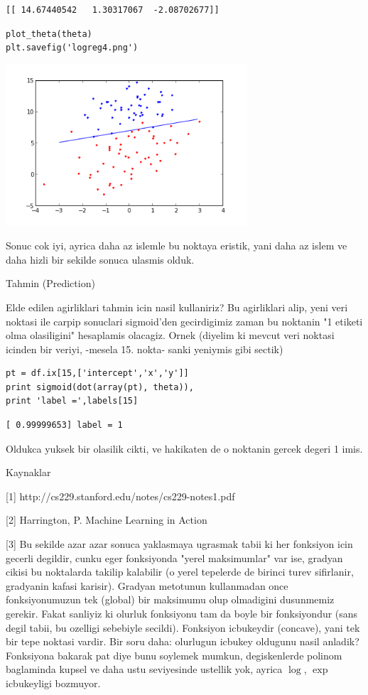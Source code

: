 \documentclass[12pt,fleqn]{article}\usepackage{../common}
\begin{document}
\begin{verbatim}
[[ 14.67440542   1.30317067  -2.08702677]]
\end{verbatim}

\begin{verbatim}
plot_theta(theta)
plt.savefig('logreg4.png')
\end{verbatim}

\includegraphics[height=6cm]{logreg4.png}

Sonuc cok iyi, ayrica daha az islemle bu noktaya eristik, yani daha
az islem ve daha hizli bir sekilde sonuca ulasmis olduk.

Tahmin (Prediction)

Elde edilen agirliklari tahmin icin nasil kullaniriz? Bu agirliklari
alip, yeni veri noktasi ile carpip sonuclari sigmoid'den gecirdigimiz
zaman bu noktanin "1 etiketi olma olasiligini" hesaplamis
olacagiz. Ornek (diyelim ki mevcut veri noktasi icinden bir veriyi,
-mesela 15. nokta- sanki yeniymis gibi sectik)

\begin{verbatim}
pt = df.ix[15,['intercept','x','y']]
print sigmoid(dot(array(pt), theta)), 
print 'label =',labels[15]
\end{verbatim}

\begin{verbatim}
[ 0.99999653] label = 1
\end{verbatim}

Oldukca yuksek bir olasilik cikti, ve hakikaten de o noktanin gercek
degeri 1 imis.

Kaynaklar

[1] http://cs229.stanford.edu/notes/cs229-notes1.pdf

[2] Harrington, P. Machine Learning in Action

[3] Bu sekilde azar azar sonuca yaklasmaya ugrasmak tabii ki her
fonksiyon icin gecerli degildir, cunku eger fonksiyonda "yerel
maksimumlar" var ise, gradyan cikisi bu noktalarda takilip kalabilir
(o yerel tepelerde de birinci turev sifirlanir, gradyanin kafasi
karisir). Gradyan metotunun kullanmadan once fonksiyonumuzun tek
(global) bir maksimumu olup olmadigini dusunmemiz gerekir. Fakat
sanliyiz ki olurluk fonksiyonu tam da boyle bir fonksiyondur (sans
degil tabii, bu ozelligi sebebiyle secildi). Fonksiyon icbukeydir
(concave), yani tek bir tepe noktasi vardir. Bir soru daha: olurlugun
icbukey oldugunu nasil anladik?  Fonksiyona bakarak pat diye bunu
soylemek mumkun, degiskenlerde polinom baglaminda kupsel ve daha ustu
seviyesinde ustellik yok, ayrica $\log$, $\exp$ icbukeyligi bozmuyor.
\end{document}
